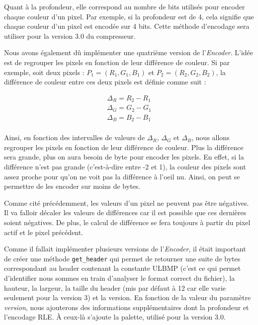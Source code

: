 \documentclass[utf8]{article}
\begin{document}
Quant à la profondeur, elle correspond au nombre de bits utilisés pour encoder chaque couleur d'un pixel. Par exemple, si la profondeur est de 4, cela signifie que chaque couleur d'un pixel est encodée sur 4 bits. Cette méthode d'encodage sera utiliser pour la version 3.0 du compresseur. 

Nous avons également dû implémenter une quatrième  version de l'\textit{Encoder}. L'idée est de regrouper les pixels en fonction de leur différence de couleur. Si par exemple, soit deux pixels : $P_1 = (R_1, G_1, B_1)$ et $P_2 = (R_2, G_2, B_2)$, la différence de couleur entre ces deux pixels est définie comme suit : 

\begin{align*}
		\Delta_R = R_2 - R_1 \\
		\Delta_G = G_2 - G_1 \\
		\Delta_B =  B_2 - B_1 \\
\end{align*}

Ainsi, en fonction des intervalles de valeurs de $\Delta_R$, $\Delta_G$ et $\Delta_B$, nous allons regrouper les pixels en fonction de leur différence de couleur. Plus la différence sera grande, plus on aura besoin de byte pour encoder les pixels. En effet, si la différence n'est pas grande (c'est-à-dire entre -2 et 1), la couleur des pixels sont assez proche pour qu'on ne voit pas la différence à l'oeil nu. Ainsi, on peut se permettre de les encoder sur moins de bytes.

Comme cité précédemment, les valeurs d'un pixel ne peuvent pas être négatives. Il va falloir décaler les valeurs de différences car il est possible que ces dernières soient négatives. De plus, le calcul de différence se fera toujours à partir du pixel actif et le pixel précédent.

Comme il fallait implémenter plusieurs versions de l'\textit{Encoder}, il était important de créer une méthode \texttt{get_header} qui permet de retourner une suite de bytes correspondant au header contenant la constante ULBMP (c'est ce qui permet d'identifier nous sommes en train d'analyser le format correct du fichier), la hauteur, la largeur, la taille du header (mis par défaut à 12 car elle varie seulement pour la version 3) et la version. En fonction de la valeur du paramètre \textit{version}, nous ajouterons des informations supplémentaires dont la profondeur et l'encodage RLE. À ceux-là s'ajoute la palette, utilisé pour la version 3.0.
\end{document}
